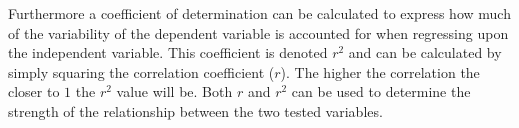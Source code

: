 Furthermore a coefficient of determination can be calculated to express how much of the variability of the dependent variable is accounted for when regressing upon the independent variable. This coefficient is denoted $r^{2}$ and can be calculated by simply squaring the correlation coefficient ($r$). The higher the correlation the closer to $1$ the $r^2$ value will be. 
Both $r$ and $r^{2}$ can be used to determine the strength of the relationship between the two tested variables. \cite{zar2009}



%
%
%




